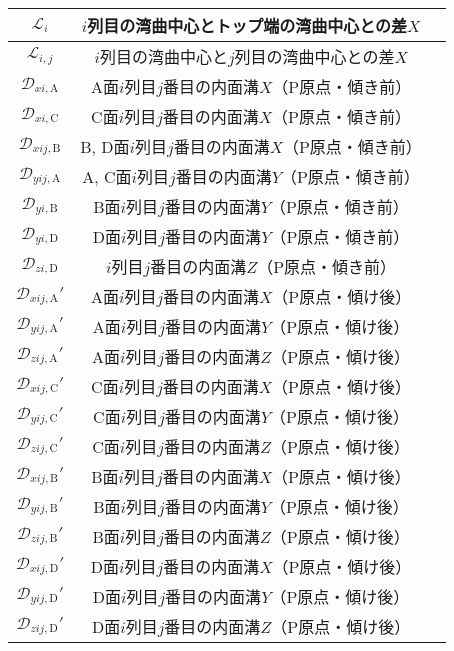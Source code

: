 \begin{longtable}{|c|Sl|}
$\mathcal L_i$ & $i$列目の湾曲中心とトップ端の湾曲中心との差$X$\\\hline
$\mathcal L_{i,j}$ & $i$列目の湾曲中心と$j$列目の湾曲中心との差$X$\\\hline
$\mathcal D_{xi,\mathrm A}$ & A面$i$列目$j$番目の内面溝$X$（P原点・傾き前）\\\hline
$\mathcal D_{xi,\mathrm C}$ & C面$i$列目$j$番目の内面溝$X$（P原点・傾き前）\\\hline
$\mathcal D_{xij,\mathrm B}$ & B, D面$i$列目$j$番目の内面溝$X$（P原点・傾き前）\\\hline
$\mathcal D_{yij,\mathrm A}$ & A, C面$i$列目$j$番目の内面溝$Y$（P原点・傾き前）\\\hline
$\mathcal D_{yi,\mathrm B}$ & B面$i$列目$j$番目の内面溝$Y$（P原点・傾き前）\\\hline
$\mathcal D_{yi,\mathrm D}$ & D面$i$列目$j$番目の内面溝$Y$（P原点・傾き前）\\\hline
$\mathcal D_{zi,\mathrm D}$ & $i$列目$j$番目の内面溝$Z$（P原点・傾き前）\\\hline
$\mathcal D_{xij,\mathrm A}'$ & A面$i$列目$j$番目の内面溝$X$（P原点・傾け後）\\\hline
$\mathcal D_{yij,\mathrm A}'$ & A面$i$列目$j$番目の内面溝$Y$（P原点・傾け後）\\\hline
$\mathcal D_{zij,\mathrm A}'$ & A面$i$列目$j$番目の内面溝$Z$（P原点・傾け後）\\\hline
$\mathcal D_{xij,\mathrm C}'$ & C面$i$列目$j$番目の内面溝$X$（P原点・傾け後）\\\hline
$\mathcal D_{yij,\mathrm C}'$ & C面$i$列目$j$番目の内面溝$Y$（P原点・傾け後）\\\hline
$\mathcal D_{zij,\mathrm C}'$ & C面$i$列目$j$番目の内面溝$Z$（P原点・傾け後）\\\hline
$\mathcal D_{xij,\mathrm B}'$ & B面$i$列目$j$番目の内面溝$X$（P原点・傾け後）\\\hline
$\mathcal D_{yij,\mathrm B}'$ & B面$i$列目$j$番目の内面溝$Y$（P原点・傾け後）\\\hline
$\mathcal D_{zij,\mathrm B}'$ & B面$i$列目$j$番目の内面溝$Z$（P原点・傾け後）\\\hline
$\mathcal D_{xij,\mathrm D}'$ & D面$i$列目$j$番目の内面溝$X$（P原点・傾け後）\\\hline
$\mathcal D_{yij,\mathrm D}'$ & D面$i$列目$j$番目の内面溝$Y$（P原点・傾け後）\\\hline
$\mathcal D_{zij,\mathrm D}'$ & D面$i$列目$j$番目の内面溝$Z$（P原点・傾け後）\\\hline

\end{longtable}
